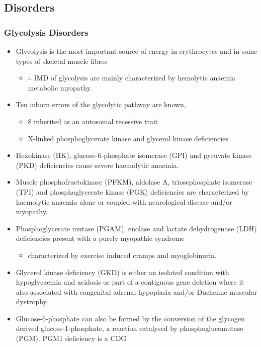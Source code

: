 \documentclass{scrartcl}
\begin{document}
\subsection{Disorders}
\label{sec:org08f0060}
\subsubsection{Glycolysis Disorders}
\label{sec:org683a1a4}
\begin{itemize}
\item Glycolysis is the most important source of energy in erythrocytes
and in some types of skeletal muscle fibres

\begin{itemize}
\item \(\therefore\) IMD of glycolysis are mainly characterized by hemolytic
anaemia \textpm{} metabolic myopathy.
\end{itemize}

\item Ten inborn errors of the glycolytic pathway are known,
\begin{itemize}
\item 8 inherited as an autosomal recessive trait
\item X-linked phosphoglycerate kinase and glycerol kinase deficiencies.
\end{itemize}

\item Hexokinase (HK), glucose-6-phosphate isomerase (GPI) and pyruvate
kinase (PKD) deficiencies cause severe haemolytic anaemia.

\item Muscle phosphofructokinase (PFKM), aldolase A, triosephosphate
isomerase (TPI) and phosphoglycerate kinase (PGK) deficiencies are
characterized by haemolytic anaemia alone or coupled with
neurological disease and/or myopathy.

\item Phosphoglycerate mutase (PGAM), enolase and lactate dehydrogenase
(LDH) deficiencies present with a purely myopathic syndrome
\begin{itemize}
\item characterized by exercise induced cramps and myoglobinuria.
\end{itemize}

\item Glycerol kinase deficiency (GKD) is either an isolated condition
with hypoglycaemia and acidosis or part of a contiguous
gene deletion where it also associated with congenital adrenal
hypoplasia and/or Duchenne muscular dystrophy.

\item Glucose-6-phosphate can also be formed by the conversion of the
glycogen derived glucose-1-phosphate, a reaction catalysed by
phosphoglucomutase (PGM). PGM1 deficiency is a CDG
\end{itemize}
\end{document}
